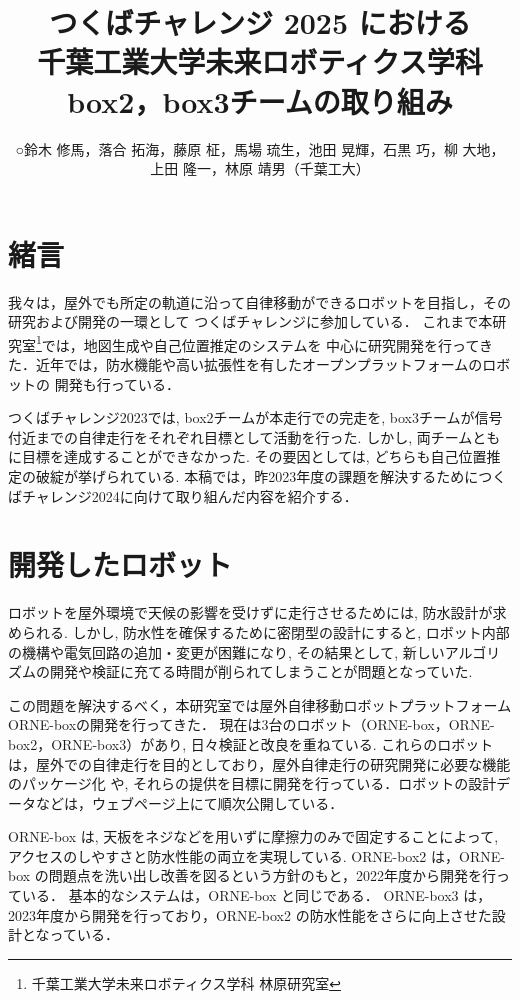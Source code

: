 \documentclass[twocolumn, 9pt]{jsproceedings}
\title{つくばチャレンジ 2025 における\\千葉工業大学未来ロボティクス学科 box2，box3チームの取り組み}
\author{○鈴木 修馬，落合 拓海，藤原 柾，馬場 琉生，池田 晃輝，石黒 巧，柳 大地，\\上田 隆一，林原 靖男（千葉工大）}
\affiliation{千葉工業大学未来ロボティクス学科 box2, box3チーム}
\begin{document}
\maketitle

\section{緒言}
我々は，屋外でも所定の軌道に沿って自律移動ができるロボットを目指し，その研究および開発の一環として
つくばチャレンジに参加している．
これまで本研究室\footnote{千葉工業大学未来ロボティクス学科 林原研究室}では，地図生成や自己位置推定のシステムを
中心に研究開発を行ってきた．近年では，防水機能や高い拡張性を有したオープンプラットフォームのロボットの
開発も行っている．

つくばチャレンジ2023では, box2チームが本走行での完走を, box3チームが信号付近までの自律走行をそれぞれ目標として活動を行った\cite{sympo2023}.
しかし, 両チームともに目標を達成することができなかった.
その要因としては, どちらも自己位置推定の破綻が挙げられている.
本稿では，昨2023年度の課題を解決するためにつくばチャレンジ2024に向けて取り組んだ内容を紹介する．

\section{開発したロボット}
ロボットを屋外環境で天候の影響を受けずに走行させるためには, 防水設計が求められる.
しかし, 防水性を確保するために密閉型の設計にすると, ロボット内部の機構や電気回路の追加・変更が困難になり, 
その結果として, 新しいアルゴリズムの開発や検証に充てる時間が削られてしまうことが問題となっていた.

この問題を解決するべく，本研究室では屋外自律移動ロボットプラットフォーム ORNE-boxの開発を行ってきた\cite{box}．
現在は3台のロボット（ORNE-box，ORNE-box2，ORNE-box3）があり, 日々検証と改良を重ねている.
これらのロボットは，屋外での自律走行を目的としており，屋外自律走行の研究開発に必要な機能のパッケージ化
や, それらの提供を目標に開発を行っている．ロボットの設計データなどは，ウェブページ上にて順次公開している\cite{box-data}．

ORNE-box は, 天板をネジなどを用いずに摩擦力のみで固定することによって, アクセスのしやすさと防水性能の両立を実現している.
ORNE-box2 は，ORNE-box の問題点を洗い出し改善を図るという方針のもと，2022年度から開発を行っている．
基本的なシステムは，ORNE-box と同じである．
ORNE-box3 は，2023年度から開発を行っており，ORNE-box2 の防水性能をさらに向上させた設計となっている．
\end{document}
